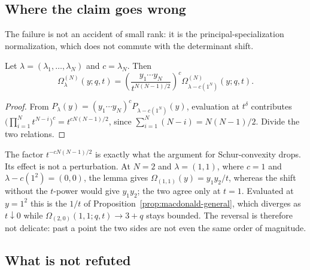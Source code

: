 \subsection*{Where the claim goes wrong}

The failure is not an accident of small rank: it is the principal-specialization
normalization, which does not commute with the determinant shift.

\begin{lemma}\label{lem:macdonald-shift}
Let $\lambda=(\lambda_1,\ldots,\lambda_N)$ and $c=\lambda_N$.  Then
\[
\Omega^{(N)}_\lambda(y;q,t)
=\left(\frac{y_1\cdots y_N}{t^{N(N-1)/2}}\right)^{c}
\Omega^{(N)}_{\lambda-c(1^N)}(y;q,t).
\]
\end{lemma}
\begin{proof}
From $P_\lambda(y)=(y_1\cdots y_N)^cP_{\lambda-c(1^N)}(y)$, evaluation at
$t^\delta$ contributes $\bigl(\prod_{i=1}^Nt^{N-i}\bigr)^c=t^{cN(N-1)/2}$, since
$\sum_{i=1}^N(N-i)=N(N-1)/2$.  Divide the two relations.
\end{proof}

The factor $t^{-cN(N-1)/2}$ is exactly what the argument for Schur-convexity
drops.  Its effect is not a perturbation.  At $N=2$ and $\lambda=(1,1)$, where
$c=1$ and $\lambda-c(1^2)=(0,0)$, the lemma gives
$\Omega_{(1,1)}(y)=y_1y_2/t$, whereas the shift without the $t$-power would give
$y_1y_2$; the two agree only at $t=1$.  Evaluated at $y=1^2$ this is the $1/t$
of Proposition~\ref{prop:macdonald-general}, which diverges as $t\downarrow0$ while
$\Omega_{(2,0)}(1,1;q,t)\to3+q$ stays bounded.  The reversal is therefore not
delicate: past a point the two sides are not even the same order of magnitude.

\subsection*{What is not refuted}

